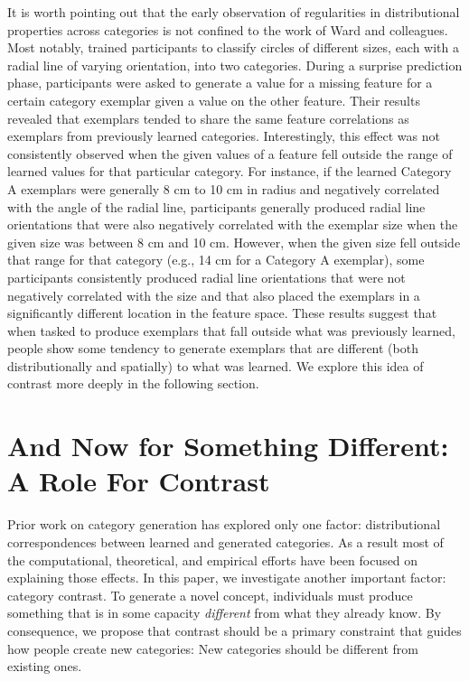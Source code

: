 \documentclass[12pt]{article}
\begin{document}
\begin{flushleft}
It is worth pointing out that the early observation of regularities in
distributional properties across categories is not confined to the work of Ward
and colleagues. Most notably, \citet{thomas98} trained participants to classify
circles of different sizes, each with a radial line of varying orientation, into
two categories. During a surprise prediction phase, participants were asked to
generate a value for a missing feature for a certain category exemplar given a
value on the other feature. Their results revealed that exemplars tended to
share the same feature correlations as exemplars from previously learned
categories. Interestingly, this effect was not consistently observed when the
given values of a feature fell outside the range of learned values for that
particular category. For instance, if the learned Category A exemplars were
generally 8 cm to 10 cm in radius and negatively correlated with the angle of
the radial line, participants generally produced radial line orientations that
were also negatively correlated with the exemplar size when the given size was
between 8 cm and 10 cm. However, when the given size fell outside that range for
that category (e.g., 14 cm for a Category A exemplar), some participants
consistently produced radial line orientations that were not negatively
correlated with the size and that also placed the exemplars in a significantly
different location in the feature space. These results suggest that when tasked
to produce exemplars that fall outside what was previously learned, people show
some tendency to generate exemplars that are different (both distributionally
and spatially) to what was learned. We explore this idea of contrast
more deeply in the following section.

\section{And Now for Something Different: A Role For Contrast}

Prior work on category generation has explored only one factor: distributional
correspondences between learned and generated categories. As a result most of
the computational, theoretical, and empirical efforts have been focused on
explaining those effects. In this paper, we investigate another important
factor: category contrast. To generate a novel concept, individuals must produce
something that is in some capacity {\em different} from what they already know.
By consequence, we propose that contrast should be a primary constraint that
guides how people create new categories: New categories should be different from
existing ones.


\end{flushleft}
\end{document}

